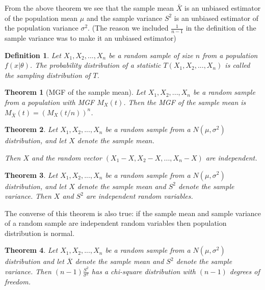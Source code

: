 \documentclass[14pt,twoside]{extreport}
\theoremstyle{dotless}
\newtheorem*{defn}{Definition}
\newtheorem*{thm}{Theorem} %
\begin{document}
From the above theorem we see that the sample mean $\bar{X}$ is an unbiased estimator of the population mean $\mu$ and the sample variance $S^2$ is an unbiased estimator of the population variance $\sigma^2$. (The reason we included $\frac{1}{n-1}$ in the  definition of the sample variance was to make it an unbiased estimator)

\begin{defn}
    Let $X_1, X_2, ..., X_n$ be a random sample of size $n$ from a population $f(x|\theta)$. The probability distribution of a statistic $T(X_1, X_2, ..., X_n)$ is called the sampling distribution of $T$.
\end{defn}

\begin{thm}[MGF of the sample mean]
    Let $X_1, X_2, ..., X_n$ be a random sample from a population with MGF $M_X(t)$. Then the MGF of the sample mean is $M_{\bar{X}} (t) = (M_X (t/n))^n$.
\end{thm}

\begin{thm}
    Let $X_1, X_2, . . . , X_n$ be a random sample from a $N(\mu, \sigma^2)$ distribution, and let $X$ denote the sample mean.

    Then $X$ and the random vector $(X_1 - X, X_2 - X, . . . , X_n - X)$ are independent.
\end{thm}

\begin{thm}
    Let $X_1, X_2, . . . , X_n$ be a random sample from a $N(\mu, \sigma^2)$ distribution, 
    and let $X$ denote the sample mean and $S^2$ denote the sample variance. Then $X$ and $S^2$ are independent random variables.
\end{thm}
The converse of this theorem is also true: if the sample mean and sample variance of a random sample are independent random variables then population distribution is normal.

\begin{thm}
    Let $X_1, X_2, ... , X_n$ be a random sample from a $N(\mu, \sigma^2)$ distribution and let $\overline{X}$ denote the sample mean and $S^2$ denote the sample variance. Then $(n-1) \frac{S^2}{\sigma^2}$ has a chi-square distribution with $(n-1)$ degrees of freedom.
\end{thm}
\end{document}
